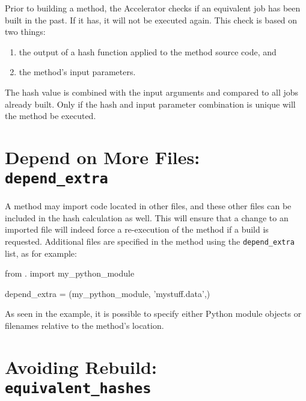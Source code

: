 Prior to building a method, the Accelerator checks if an equivalent
job has been built in the past.  If it has, it will not be executed
again.  This check is based on two things:
\begin{enumerate}
\item  the output of a hash function applied to the method source code, and
\item  the method's input parameters.
\end{enumerate}
The hash value is combined with the input arguments and compared to
all jobs already built.  Only if the hash and input parameter
combination is unique will the method be executed.



\section{Depend on More Files:  \texttt{depend\_extra}}

A method may import code located in other files, and these other files
can be included in the hash calculation as well.  This will ensure
that a change to an imported file will indeed force a re-execution of
the method if a build is requested.  Additional files are specified in
the method using the \texttt{depend\_extra} list, as for example:
\begin{python}
from . import my_python_module

depend_extra = (my_python_module, 'mystuff.data',)
\end{python}
As seen in the example, it is possible to specify either Python module
objects or filenames relative to the method's location.



\section{Avoiding Rebuild: \texttt{equivalent\_hashes}}
\label{sec:equivalent_hashes}

